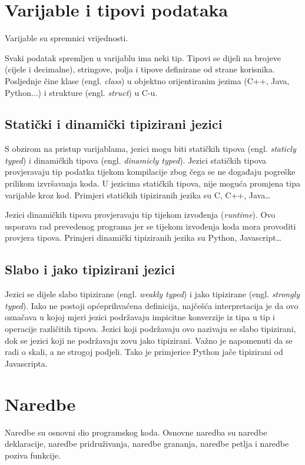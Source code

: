 \documentclass[times, utf8, zavrsni]{fer}
\begin{document}
\section{Varijable i tipovi podataka}
Varijable su spremnici vrijednosti.

Svaki podatak spremljen u varijablu ima neki tip. Tipovi se dijeli na brojeve (cijele i decimalne), stringove, polja i tipove definirane od strane korisnika. Posljednje
čine klase (engl. \textit{class}) u objektno orijentiranim jezima (C++, Java, Python...) i strukture (engl. \textit{struct}) u C-u.

\subsection{Statički i dinamički tipizirani jezici}
S obzirom na pristup varijablama, jezici mogu biti statičkih tipova (engl. \textit{staticly typed}) i dinamičkih tipova (engl. \textit{dinamicly typed}).
Jezici statičkih tipova provjeravaju tip podatka tijekom kompilacije zbog čega se ne događaju pogreške prilikom izvršavanja koda. U jezicima statičkih tipova, nije moguća promjena tipa 
varijable kroz kod. Primjeri statičkih tipiziranih jezika su C, C++, Java\dots \cite{pythonplanet}

Jezici dinamičkih tipova provjeravaju tip tijekom izvođenja (\textit{runtime}). Ovo usporava rad prevedenog programa jer se tijekom izvođenja koda mora provoditi provjera tipova.
Primjeri dinamički tipiziranih jezika su Python, Javascript\dots \cite{pythonplanet}

\subsection{Slabo i jako tipizirani jezici}
Jezici se dijele slabo tipizirane (engl. \textit{weakly typed}) i jako tipizirane (engl. \textit{strongly typed}). Iako ne postoji općeprihvaćena definicija, 
najčešća interpretacija je da ovo označava u kojoj mjeri jezici podržavaju impicitne konverzije iz tipa u tip i operacije različitih tipova. Jezici koji podržavaju ovo nazivaju
se slabo tipizirani, dok se jezici koji ne podržavaju zovu jako tipizirani. Važno je napomenuti da se radi o skali, a ne strogoj podjeli. Tako je primjerice Python jače tipizirani od Javascripta. \cite{zolatypes}

\section{Naredbe}
Naredbe su osnovni dio programskog koda. Osnovne naredba su naredbe deklaracije, naredbe pridruživanja, naredbe grananja, naredbe petlja i naredbe poziva funkcije.
\end{document}
